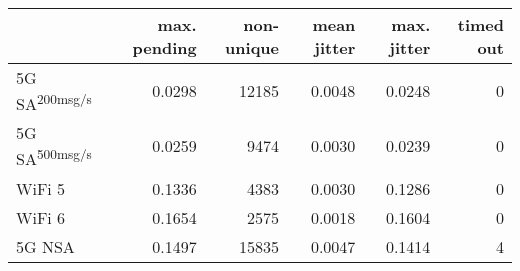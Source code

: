 \begin{tabular}{l|rrrrr}
\rowcolor{gray!50}
 & max. pending & non-unique & mean jitter & max. jitter & timed out\\\hline
5G SA\textsuperscript{200msg/s} & 0.0298 & 12185 & 0.0048 & 0.0248 & 0 \\
5G SA\textsuperscript{500msg/s} & 0.0259 & 9474 & 0.0030 & 0.0239 & 0 \\
WiFi 5 & 0.1336 & 4383 & 0.0030 & 0.1286 & 0 \\
WiFi 6 & 0.1654 & 2575 & 0.0018 & 0.1604 & 0 \\
5G NSA & 0.1497 & 15835 & 0.0047 & 0.1414 & 4 \\
\end{tabular}

